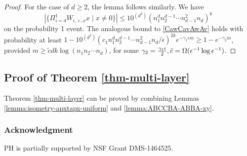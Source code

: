 \documentclass[11pt]{article}
\newcommand{\ctilde}{\tilde{c}}
\newcommand{\eps}{\epsilon}
\newcommand{\red}[1]{{\color{black} #1}}
\newcommand{\PiWd}{\Pi_{i=d}^1 W_{i,+,x}}
\begin{document}
\begin{proof}
For the case of $d \geq 2$, the lemma follows similarly.  We have 
\[
|\{ \PiWd x \mid x \neq 0\}| \leq 10^{(d^2)} (n_1^d n_2^{d-1} \cdots n_{d-1}^2 n_d)^k
\] on the probability 1 event.  The analogous bound to \eqref{CawCavAwAv} holds with probability at least $1 - 10^{(d^2)}(c_1 n_1^d n_2^{d-1} \cdots n_{d-1}^2 n_d /\eps)^{2k} e^{-\gamma_1 \eps m} \geq 1 - e^{-\gamma_2 m}$, provided $m \geq \ctilde d k \log(n_1 n_2 \cdots n_d)$, for some $\gamma_2 = \frac{\gamma_1 \eps}{2}, \ctilde = \Omega(\eps^{-1} \log \red{\eps^{-1}})$. 


\end{proof}

\subsection{Proof of Theorem \ref{thm-multi-layer}}

Theorem \ref{thm-multi-layer} can be proved by combining Lemmas \ref{lemma:isometry-apxtapx-uniform} and \ref{lemma:ABCCBA-ABBA-xy}.



\subsubsection*{Acknowledgment}
PH is partially supported by NSF Grant DMS-1464525.









  \appendix
  
\end{document}
